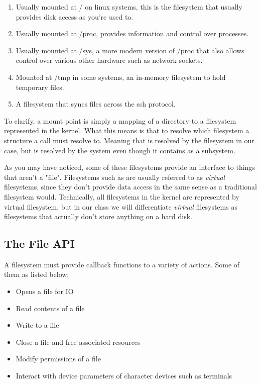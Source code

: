 \begin{enumerate}
  \item {} Usually mounted at / on linux systems, this is the filesystem that usually provides disk access as you're used to.
  \item {} Usually mounted at /proc, provides information and control over processes.
  \item {} Usually mounted at /sys, a more modern version of /proc that also allows control over various other hardware such as network sockets.
  \item {} Mounted at /tmp in some systems, an in-memory filesystem to hold temporary files.
  \item {} A filesystem that syncs files across the ssh protocol.
\end{enumerate}

To clarify, a mount point is simply a mapping of a directory to a filesystem represented in the kernel.
What this means is that to resolve which filesystem a structure a call must resolve to.
Meaning that  is resolved by the  filesystem in our case, but  is resolved by the  system even though it contains \keyword{/} as a subsystem.

As you may have noticed, some of these filesystems provide an interface to things that aren't a "file".
Filesystems such as  are usually referred to as \emph{virtual} filesystems, since they don't provide data access in the same sense as a traditional filesystem would.
Technically, all filesystems in the kernel are represented by virtual filesystem, but in our class we will differentiate \emph{virtual} filesystems as filesystems that actually don't store anything on a hard disk.

\subsection{The File API}

A filesystem must provide callback functions to a variety of actions. Some of them as listed below:

\begin{itemize}
  \item {} Opens a file for IO
  \item {} Read contents of a file
  \item {} Write to a file
  \item {} Close a file and free associated resources
  \item {} Modify permissions of a file
  \item {} Interact with device parameters of character devices such as terminals
\end{itemize}

